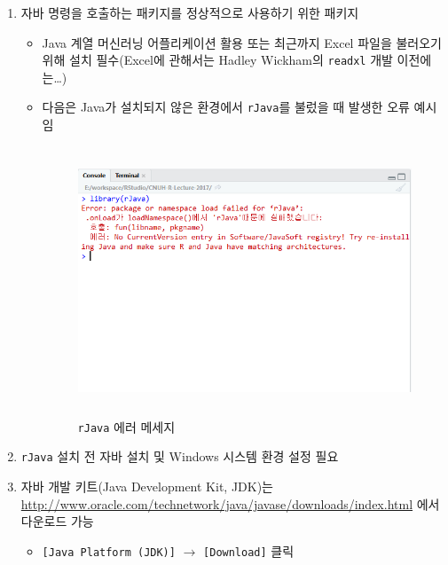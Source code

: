 \documentclass[11pt,a4paper]{book}
\providecommand{\tightlist}{%
  \setlength{\itemsep}{0pt}\setlength{\parskip}{0pt}}
\theoremstyle{definition}
\theoremstyle{definition}
\theoremstyle{definition}
\theoremstyle{remark}
\begin{document}
\begin{enumerate}
\def\labelenumi{\arabic{enumi}.}
\item
  자바 명령을 호출하는 패키지를 정상적으로 사용하기 위한 패키지

  \begin{itemize}
  \tightlist
  \item
    Java 계열 머신러닝 어플리케이션 활용 또는 최근까지 Excel 파일을
    불러오기 위해 설치 필수(Excel에 관해서는 Hadley Wickham의
    \texttt{readxl} 개발 이전에는\ldots{})
  \item
    다음은 Java가 설치되지 않은 환경에서 \texttt{rJava}를 불렀을 때
    발생한 오류 예시임

    \begin{figure}[H] {
      \centering
      \includegraphics[width = 10cm, height = 8cm]{Figures/R-rJava-error.png}
      \caption[\texttt{rJava} 에러 메세지]{\texttt{rJava} 에러 메세지}\label{fig:rJava-error}
    } \end{figure}
  \end{itemize}
\item
  \texttt{rJava} 설치 전 자바 설치 및 Windows 시스템 환경 설정 필요
\item
  자바 개발 키트(Java Development Kit, JDK)는
  \url{http://www.oracle.com/technetwork/java/javase/downloads/index.html}
  에서 다운로드 가능

  \begin{itemize}
  \tightlist
  \item
    \texttt{{[}Java\ Platform\ (JDK){]}} \(\rightarrow\)
    \texttt{{[}Download{]}} 클릭


\end{itemize}
\end{enumerate}
\end{document}

